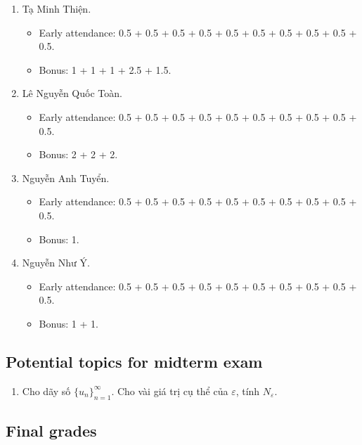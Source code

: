 \documentclass{article}
\begin{document}
\begin{enumerate}
\begin{itemize}
	\end{itemize}
	\item {\sc Tạ Minh Thiện.}
	\begin{itemize}
		\item Early attendance: 0.5 + 0.5 + 0.5 + 0.5 + 0.5 + 0.5 + 0.5 + 0.5 + 0.5 + 0.5.
		\item Bonus: 1 + 1 + 1 + 2.5 + 1.5.
	\end{itemize}
	\item {\sc Lê Nguyễn Quốc Toàn.}
	\begin{itemize}
		\item Early attendance: 0.5 + 0.5 + 0.5 + 0.5 + 0.5 + 0.5 + 0.5 + 0.5 + 0.5 + 0.5.
		\item Bonus: 2 + 2 + 2.
	\end{itemize}
	\item {\sc Nguyễn Anh Tuyển.}
	\begin{itemize}
		\item Early attendance: 0.5 + 0.5 + 0.5 + 0.5 + 0.5 + 0.5 + 0.5 + 0.5 + 0.5 + 0.5.
		\item Bonus: 1.
	\end{itemize}
	\item {\sc Nguyễn Như Ý.}
	\begin{itemize}
		\item Early attendance: 0.5 + 0.5 + 0.5 + 0.5 + 0.5 + 0.5 + 0.5 + 0.5 + 0.5 + 0.5.
		\item Bonus: 1 + 1.
	\end{itemize}
\end{enumerate}


\subsection{Potential topics for midterm exam}

\begin{enumerate}
	\item Cho dãy số $\{u_n\}_{n=1}^\infty$. Cho vài giá trị cụ thể của $\varepsilon$, tính $N_\varepsilon$.
\end{enumerate}


\subsection{Final grades}
\end{document}
